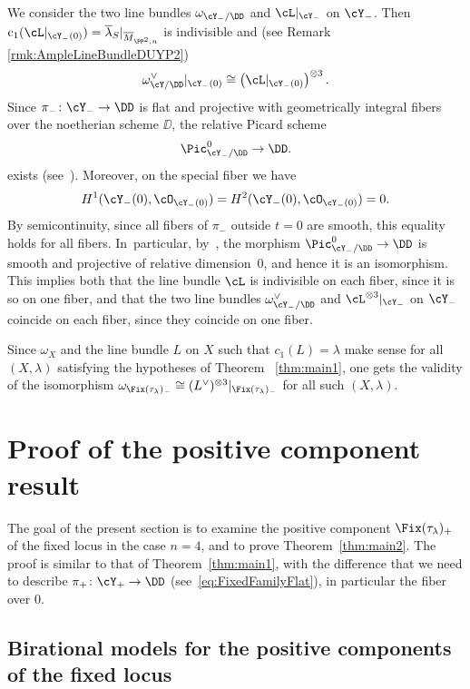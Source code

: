 We consider the two line bundles $\omega_{\cY_-/\DD}$ and $\cL |_{\cY_-}$ on $\cY_-$.
Then $\mathrm{c}_1(\cL |_{\cY_{-}(0)})=\overline{\lambda}{}_S|_{\overline{M}_{\PP^2,n}}$ is indivisible and (see Remark \ref{rmk:AmpleLineBundleDUYP2})
\[
\omega_{\cY/\DD}^\vee |_{\cY_{-}(0)} \cong \left(\cL |_{\cY_{-}(0)}\right)^{\otimes 3}.
\]
Since $\pi_-\colon\cY_-\to \DD$ is flat and projective with geometrically integral fibers over the noetherian scheme $\DD$, the relative Picard scheme
\[
\Pic_{\cY_-/\DD}^0\to \DD.
\]
exists (see~\cite[Th.\,4.8]{Kleiman:Picard}).
Moreover, on the special fiber we have
\[
H^1(\cY_{-}(0),\cO_{\cY_{-}(0)})=H^2(\cY_{-}(0),\cO_{\cY_{-}(0)})=0.
\]
By semicontinuity, since all fibers of $\pi_-$ outside $t=0$ are smooth, this equality holds for all fibers. In~particular, by~\cite[Prop.\,5.19]{Kleiman:Picard}, the morphism $\Pic_{\cY_-/\DD}^0\to \DD$ is smooth and projective of relative dimension~0, and hence it is an isomorphism.
This implies both that the line bundle $\cL$ is indivisible on each fiber, since it is so on one fiber, and that the two line bundles $\omega_{\cY_-/\DD}^\vee$ and $\cL^{\otimes 3} |_{\cY_-}$ on $\cY_-$ coincide on each fiber, since they coincide on one fiber.

Since $\omega_X$ and the line bundle $L$ on $X$ such that $c_1(L)=\lambda$ make sense for all $(X,\lambda)$ satisfying the hypotheses of Theorem ~\ref{thm:main1}, one gets the validity of the isomorphism $\omega_{\Fix(\tau_{\lambda})_-}\cong (L^{\vee})^{\otimes 3}\vert_{\Fix(\tau_{\lambda})_-}$ for all such $(X, \lambda)$.

\section{Proof of the positive component result}\label{sec:cubic4folds}

The goal of the present section is to examine the positive component $\Fix(\tau_{\lambda})_+$ of the fixed locus in the case $n=4$, and to prove Theorem~\ref{thm:main2}.
The proof is similar to that of Theorem~\ref{thm:main1}, with the difference that we need to describe $\pi_{+}\colon \cY_{+}\to\DD$ (see~\eqref{eq:FixedFamilyFlat}), in particular the fiber over $0$.

\subsection{Birational models for the positive components of the fixed locus}\label{subsection:SecondComponentDegree2}

